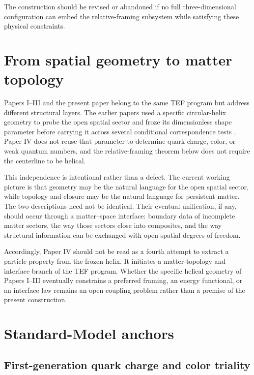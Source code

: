 \documentclass[aps,prd,reprint,superscriptaddress,nofootinbib,longbibliography,floatfix]{revtex4-2}
\begin{document}
The construction should be revised or abandoned if no full three-dimensional configuration can embed the relative-framing subsystem while satisfying these physical constraints.
\section{From spatial geometry to matter topology}
\label{sec:continuity}

Papers I--III and the present paper belong to the same TEF program but address different structural layers. The earlier papers used a specific circular-helix geometry to probe the open spatial sector and froze its dimensionless shape parameter before carrying it across several conditional correspondence tests \cite{WuI,WuII,WuIII}. Paper IV does not reuse that parameter to determine quark charge, color, or weak quantum numbers, and the relative-framing theorem below does not require the centerline to be helical.

This independence is intentional rather than a defect. The current working picture is that geometry may be the natural language for the open spatial sector, while topology and closure may be the natural language for persistent matter. The two descriptions need not be identical. Their eventual unification, if any, should occur through a matter--space interface: boundary data of incomplete matter sectors, the way those sectors close into composites, and the way structural information can be exchanged with open spatial degrees of freedom.

Accordingly, Paper IV should not be read as a fourth attempt to extract a particle property from the frozen helix. It initiates a matter-topology and interface branch of the TEF program. Whether the specific helical geometry of Papers I--III eventually constrains a preferred framing, an energy functional, or an interface law remains an open coupling problem rather than a premise of the present construction.
\section{Standard-Model anchors}
\label{sec:anchors}

\subsection{First-generation quark charge and color triality}
\end{document}
